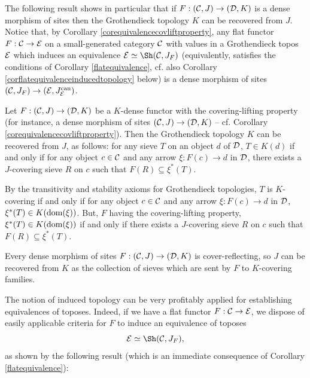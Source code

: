 \documentclass[a4paper,12pt]{article}
\begin{document}
The following result shows in particular that if $F:({\cal C}, J)\to ({\cal D}, K)$ is a dense morphism of sites then the Grothendieck topology $K$ can be recovered from $J$. Notice that, by Corollary \ref{corequivalencecovliftproperty}, any flat functor $F:{\cal C}\to {\cal E}$ on a small-generated category $\cal C$ with values in a Grothendieck topos $\cal E$ which induces an equivalence ${\cal E} \simeq \Sh({\cal C}, J_{F})$ (equivalently, satisfies the conditions of Corollary \ref{flatequivalence}, cf. also Corollary \ref{corflatequivalenceinducedtopology} below) is a dense morphism of sites $({\cal C}, J_{F})\to ({\cal E}, J_{\cal E}^{\textup{can}})$. 

\begin{proposition}\label{proprecoverytopology}
	Let $F:({\cal C}, J)\to ({\cal D}, K)$ be a $K$-dense functor with the covering-lifting property (for instance, a dense morphism of sites $({\cal C}, J)\to ({\cal D}, K)$ -- cf. Corollary \ref{corequivalencecovliftproperty}). Then the Grothendieck topology $K$ can be recovered from $J$, as follows: for any sieve $T$ on an object $d$ of $\cal D$, $T\in K(d)$ if and only if for any object $c\in {\cal C}$ and any arrow $\xi:F(c)\to d$ in $\cal D$, there exists a $J$-covering sieve $R$ on $c$ such that $F(R)\subseteq \xi^{\ast}(T)$.  
\end{proposition}

\begin{proofs}
 By the transitivity and stability axioms for Grothendieck topologies, $T$ is $K$-covering if and only if for any object $c\in {\cal C}$ and any arrow $\xi:F(c)\to d$ in $\cal D$, $\xi^{\ast}(T)\in K(\textup{dom}(\xi))$. But, $F$ having the covering-lifting property, $\xi^{\ast}(T)\in K(\textup{dom}(\xi))$ if and only if there exists a $J$-covering sieve $R$ on $c$ such that $F(R)\subseteq \xi^{\ast}(T)$. 
\end{proofs}

\begin{remark}
	Every dense morphism of sites $F:({\cal C}, J)\to ({\cal D}, K)$ is cover-reflecting, so $J$ can be recovered from $K$ as the collection of sieves which are sent by $F$ to $K$-covering families.
\end{remark}

The notion of induced topology can be very profitably applied for establishing equivalences of toposes. Indeed, if we have a flat functor $F:{\cal C}\to {\cal E}$, we dispose of easily applicable criteria for $F$ to induce an equivalence of toposes 
\[
{\cal E}\simeq \Sh({\cal C}, J_{F}),
\]
as shown by the following result (which is an immediate consequence of Corollary \ref{flatequivalence}):
\end{document}
